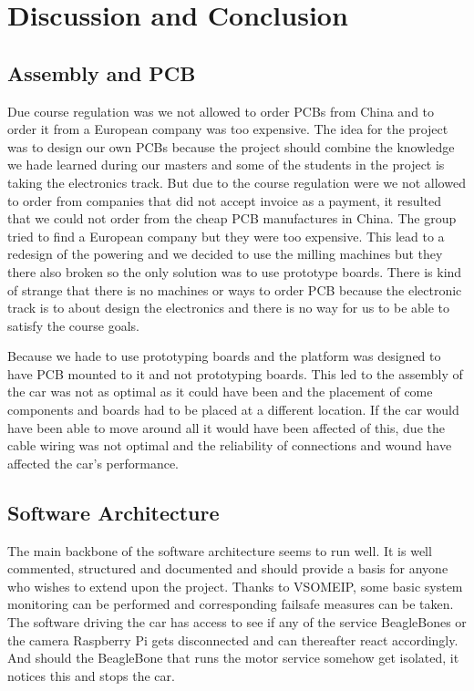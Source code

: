 \documentclass[11pt, titlepage]{article} %
\begin{document}
\clearpage
\section{Discussion and Conclusion}

\subsection{Assembly and PCB}
Due course regulation was we not allowed to order PCBs from China and to order it from a European company was too expensive. 
The idea for the project was to design our own PCBs because the project should combine the knowledge we hade learned during our masters and some of the students in the project is taking the electronics track. But due to the course regulation were we not allowed to order from companies that did not accept invoice as a payment, it resulted that we could not order from the cheap PCB manufactures in China. The group tried to find a European company but they were too expensive. This lead to a redesign of the powering and we decided to use the milling machines but they there also broken so the only solution was to use prototype boards. There is kind of strange that there is no machines or ways to order PCB because the electronic track is to about design the electronics and there is no way for us to be able to satisfy the course goals. 

Because we hade to use prototyping boards and the platform was designed to have PCB mounted to it and not prototyping boards. This led to the assembly of the car was not as optimal as it could have been and the placement of come components and boards had to be placed at a different location. If the car would have been able to move around all it would have been affected of this, due the cable wiring was not optimal and the reliability of connections and wound have affected the car's performance. 

\subsection{Software Architecture}
The main backbone of the software architecture seems to run well. It is well commented, structured and documented
and should provide a basis for anyone who wishes to extend upon the project. Thanks to VSOMEIP, some basic system
monitoring can be performed and corresponding failsafe measures can be taken. The software driving the car has access
to see if any of the service BeagleBones or the camera Raspberry Pi gets disconnected and can thereafter react accordingly.
And should the BeagleBone that runs the motor service somehow get isolated, it notices this and stops the car.
\end{document}
